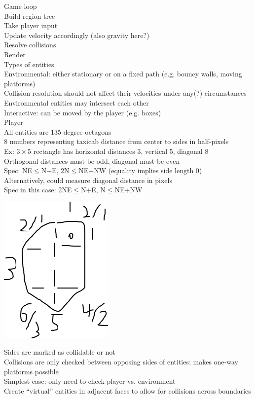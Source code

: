 \documentclass{article}
\begin{document}
Game loop \\
Build region tree \\
Take player input \\
Update velocity accordingly (also gravity here?) \\
Resolve collisions \\
Render \\

Types of entities \\
Environmental: either stationary or on a fixed path (e.g. bouncy walls, moving platforms) \\
Collision resolution should not affect their velocities under any(?) circumstances \\
Environmental entities may intersect each other \\
Interactive: can be moved by the player (e.g. boxes) \\
Player \\
All entities are 135 degree octagons \\
8 numbers representing taxicab distance from center to sides in half-pixels \\
Ex: $3 \times 5$ rectangle has horizontal distances 3, vertical 5, diagonal 8 \\
Orthogonal distances must be odd, diagonal must be even \\
Spec: NE$\leq$N+E, 2N$\leq$NE+NW (equality implies side length 0) \\
Alternatively, could measure diagonal distance in pixels \\
Spec in this case: 2NE$\leq$N+E, N$\leq$NE+NW \\

\begin{center}
  \includegraphics[width=0.25\linewidth]{entity.png}
\end{center}

Sides are marked as collidable or not \\
Collisions are only checked between opposing sides of entities:
makes one-way platforms possible \\
Simplest case: only need to check player vs. environment \\
Create ``virtual'' entities in adjacent faces to allow for collisions across boundaries \\
\end{document}
